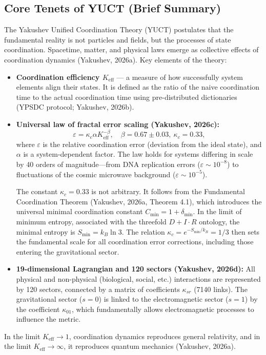 \documentclass[12pt]{article}
\theoremstyle{remark}
\newcommand{\Keff}{K_{\mathrm{eff}}}
\newcommand{\eps}{\varepsilon}
\newcommand{\kappac}{\kappa_c}
\newcommand{\constmin}{C_{\min}}
\newcommand{\dint}{\ensuremath{D\!+\!I\!\cdot\!R}}
\begin{document}
	\subsection{Core Tenets of YUCT (Brief Summary)}
	\label{subsec:yuct-core}
	
	The Yakushev Unified Coordination Theory (YUCT) postulates that the fundamental reality is not particles and fields, but the processes of state coordination. Spacetime, matter, and physical laws emerge as collective effects of coordination dynamics (Yakushev, 2026a). Key elements of the theory:
	\begin{itemize}
		\item \textbf{Coordination efficiency $\Keff$} — a measure of how successfully system elements align their states. It is defined as the ratio of the naive coordination time to the actual coordination time using pre-distributed dictionaries (YPSDC protocol; Yakushev, 2026b).
		\item \textbf{Universal law of fractal error scaling (Yakushev, 2026c):}
		\begin{equation}
			\eps = \kappac \alpha \Keff^{-\beta}, \quad \beta = 0.67 \pm 0.03, \ \kappac = 0.33,
			\label{eq:universal-scaling}
		\end{equation}
		where $\eps$ is the relative coordination error (deviation from the ideal state), and $\alpha$ is a system-dependent factor. The law holds for systems differing in scale by 40 orders of magnitude—from DNA replication errors ($\eps\sim 10^{-8}$) to fluctuations of the cosmic microwave background ($\eps\sim 10^{-5}$).
		
		The constant $\kappac = 0.33$ is not arbitrary. It follows from the Fundamental Coordination Theorem (Yakushev, 2026a, Theorem 4.1), which introduces the universal minimal coordination constant $\constmin = 1 + \delta_{\min}$. In the limit of minimum entropy, associated with the threefold $\dint$ ontology, the minimal entropy is $S_{\min} = k_B \ln 3$. The relation $\kappac = e^{-S_{\min}/k_B} = 1/3$ then sets the fundamental scale for all coordination error corrections, including those entering the gravitational sector.
		
		\item \textbf{19-dimensional Lagrangian and 120 sectors (Yakushev, 2026d):} All physical and non-physical (biological, social, etc.) interactions are represented by 120 sectors, connected by a matrix of coefficients $\kappa_{sr}$ (7140 links). The gravitational sector ($s=0$) is linked to the electromagnetic sector ($s=1$) by the coefficient $\kappa_{01}$, which fundamentally allows electromagnetic processes to influence the metric.
	\end{itemize}
	In the limit $\Keff \to 1$, coordination dynamics reproduces general relativity, and in the limit $\Keff \to \infty$, it reproduces quantum mechanics (Yakushev, 2026a).
	
\end{document}
